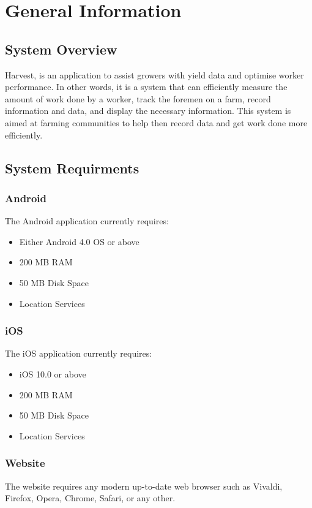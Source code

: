 \documentclass[11pt]{article}
\begin{document}
\newpage
\tableofcontents

\newpage
\section{General Information}
\subsection{System Overview}
Harvest, is an application to assist growers with yield data and optimise worker performance. In other words, it is a system that can efficiently measure the amount of work done by a worker, track the foremen on a farm, record information and data, and display the necessary information. This system is aimed at farming communities to help then record data and get work done more efficiently.\\

\subsection{System Requirments}
\subsubsection{Android}
The Android application currently requires:
\begin{itemize}
	\item Either Android 4.0 OS or above
\item 200 MB RAM
\item 50 MB Disk Space	
	\item Location Services
\end{itemize}
\subsubsection{iOS}
The iOS application currently requires:
\begin{itemize}
	\item iOS 10.0 or above
\item 200 MB RAM
\item 50 MB Disk Space	
	\item Location Services
\end{itemize}
\subsubsection{Website}
The website requires any modern up-to-date web browser such as Vivaldi, Firefox, Opera, Chrome, Safari, or any other.
\end{document}
